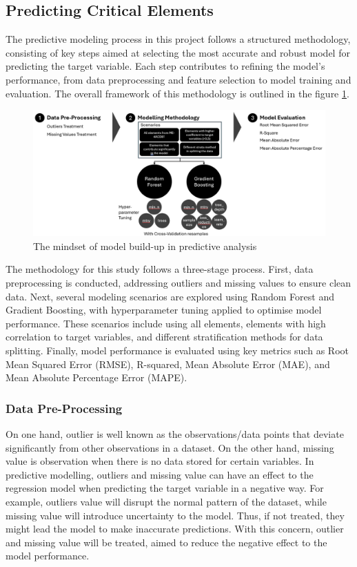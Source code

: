 \documentclass[11pt,a4paper,]{article}
\begin{document}
\subsection{Predicting Critical Elements}\label{predicting-critical-elements}

The predictive modeling process in this project follows a structured methodology, consisting of key steps aimed at selecting the most accurate and robust model for predicting the target variable. Each step contributes to refining the model's performance, from data preprocessing and feature selection to model training and evaluation. The overall framework of this methodology is outlined in the figure \ref{fig:modelbuilding}.

\begin{figure}
\centering
\includegraphics{Final_report_files/figure-latex/Methodology.png}
\caption{\label{fig:modelbuilding}The mindset of model build-up in predictive analysis}
\end{figure}

The methodology for this study follows a three-stage process. First, data preprocessing is conducted, addressing outliers and missing values to ensure clean data. Next, several modeling scenarios are explored using Random Forest and Gradient Boosting, with hyperparameter tuning applied to optimise model performance. These scenarios include using all elements, elements with high correlation to target variables, and different stratification methods for data splitting. Finally, model performance is evaluated using key metrics such as Root Mean Squared Error (RMSE), R-squared, Mean Absolute Error (MAE), and Mean Absolute Percentage Error (MAPE).

\subsubsection{Data Pre-Processing}\label{data-pre-processing}

On one hand, outlier is well known as the observations/data points that deviate significantly from other observations in a dataset. On the other hand, missing value is observation when there is no data stored for certain variables. In predictive modelling, outliers and missing value can have an effect to the regression model when predicting the target variable in a negative way. For example, outliers value will disrupt the normal pattern of the dataset, while missing value will introduce uncertainty to the model. Thus, if not treated, they might lead the model to make inaccurate predictions. With this concern, outlier and missing value will be treated, aimed to reduce the negative effect to the model performance.
\end{document}
